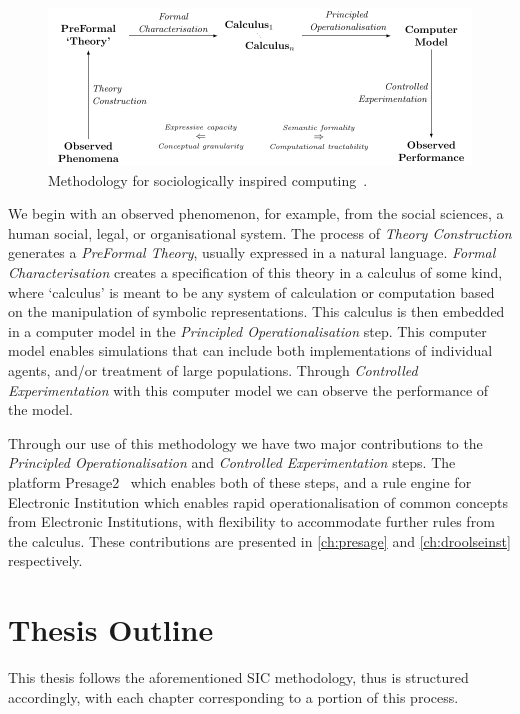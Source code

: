 \begin{figure}
\includegraphics[width=\linewidth]{gfx/sic}
\caption[Methodology for sociologically inspired computing.]{Methodology for sociologically inspired computing~\citep{Jones2013}.}\label{fig:sic}
\end{figure}

We begin with an observed phenomenon, for example, from the social sciences, a human social, legal, or organisational system. The process of \emph{Theory Construction} generates a \emph{PreFormal Theory}, usually expressed in a natural language. \emph{Formal Characterisation} creates a specification of this theory in a calculus of some kind, where `calculus' is meant to be any system of calculation or computation based on the manipulation of symbolic representations. This calculus is then embedded in a computer model in the \emph{Principled Operationalisation} step. This computer model enables simulations that can include both implementations of individual agents, and/or treatment of large populations. Through \emph{Controlled Experimentation} with this computer model we can observe the performance of the model.

Through our use of this methodology we have two major contributions to the \emph{Principled Operationalisation} and \emph{Controlled Experimentation} steps. The platform Presage2~\citep{Macbeth2014} which enables both of these steps, and a rule engine for Electronic Institution which enables rapid operationalisation of common concepts from Electronic Institutions, with flexibility to accommodate further rules from the calculus. These contributions are presented in \autoref{ch:presage} and \autoref{ch:droolseinst} respectively.

\section{Thesis Outline}

This thesis follows the aforementioned \ac{SIC} methodology, thus is structured accordingly, with each chapter corresponding to a portion of this process.

